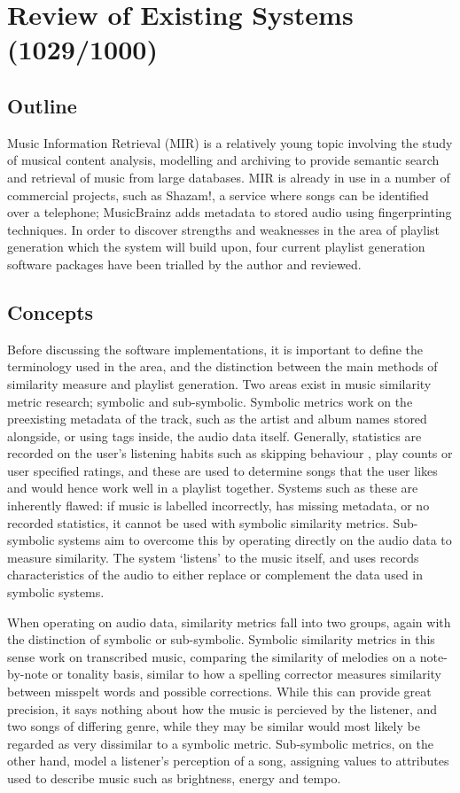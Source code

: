 \chapter{Review of Existing Systems (1029/1000)}
\section{Outline}
Music Information Retrieval (MIR) is a relatively young topic involving the study of musical content analysis, modelling and archiving to provide semantic search and retrieval of music from large databases. MIR is already in use in a number of commercial projects, such as Shazam!, a service where songs can be identified over a telephone; MusicBrainz adds metadata to stored audio using fingerprinting techniques. 
In order to discover strengths and weaknesses in the area of playlist generation which the system will build upon, four current playlist generation software packages have been trialled by the author and reviewed.
\section{Concepts}
Before discussing the software implementations, it is important to define the terminology used in the area, and the distinction between the main methods of similarity measure and playlist generation. Two areas exist in music similarity metric research; symbolic and sub-symbolic. Symbolic metrics work on the preexisting metadata of the track, such as the artist and album names stored alongside, or using  tags inside, the audio data itself. Generally, statistics are recorded on the user's listening habits such as skipping behaviour \citep{Pampalk2005a}, play counts or user specified ratings, and these are used to determine songs that the user likes and would hence work well in a playlist together. Systems such as these are inherently flawed: if music is labelled incorrectly, has missing metadata, or no recorded statistics, it cannot be used with symbolic similarity metrics. Sub-symbolic systems aim to overcome this by operating directly on the audio data to measure similarity. The system `listens' to the music itself, and uses records characteristics of the audio to either replace or complement the data used in symbolic systems.

When operating on audio data, similarity metrics fall into two groups, again with the distinction of symbolic or sub-symbolic. Symbolic similarity metrics in this sense work on transcribed music, comparing the similarity of melodies on a note-by-note or tonality basis, similar to how a spelling corrector measures similarity between misspelt words and possible corrections. While this can provide great precision, it says nothing about how the music is percieved by the listener, and two songs of differing genre, while they may be similar would most likely be regarded as very dissimilar to a symbolic metric. Sub-symbolic metrics, on the other hand, model a listener's perception of a song, assigning values to attributes used to describe music such as brightness, energy and tempo.
